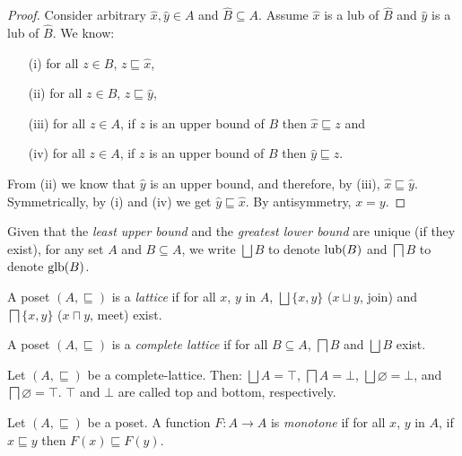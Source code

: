 \begin{proof}
    Consider arbitrary $\hat{x}, \hat{y} \in A$ and $\hat B \subseteq A$. Assume $\hat x$ is a lub of $\hat B$
    and $\hat y$ is a lub of $\hat B$. We know:
    \begin{enumerate}
        \item[(i)] for all $z \in B$, $z \sqsubseteq \hat{x}$,
        \item[(ii)] for all $z \in B$, $z \sqsubseteq \hat{y}$,
        \item[(iii)] for all $z \in A$, if $z$ is an upper bound of $B$ then
        $\hat x \sqsubseteq z$ and
        \item[(iv)]for all $z \in A$, if $z$ is an upper bound of $B$ then $\hat
        y \sqsubseteq z$.
    \end{enumerate}
    From (ii) we know that $\hat{y}$ is an upper bound, and therefore, by (iii), $\hat{x} \sqsubseteq \hat{y}$. Symmetrically, by (i) and (iv) we get $\hat{y} \sqsubseteq \hat{x}$. By antisymmetry, $x = y$.
\end{proof}

Given that the \emph{least upper bound} and the \emph{greatest lower bound} are unique (if they exist), for any set $A$ and $B \subseteq A$, we write $\bigsqcup B$ to denote $\operatorname{lub}(B)$ and $\bigsqcap B$ to denote $\operatorname{glb}(B)$.

\begin{definition}[Lattice]
    A poset $(A,\sqsubseteq)$ is a \emph{lattice} if for all $x$, $y$ in $A$, $\bigsqcup \{x,y\}$ ($x \sqcup y$, join) and $\bigsqcap \{x,y\}$ ($x \sqcap y$, meet) exist.
\end{definition}

\begin{definition}
    A poset $(A,\sqsubseteq)$ is a \emph{complete lattice} if for all $B \subseteq A$, $\bigsqcap B$ and $\bigsqcup B$ exist.
\end{definition}

\begin{example}
    Let $(A,\sqsubseteq)$ be a complete-lattice. Then: $\bigsqcup A = \top$, $\bigsqcap A = \bot$, $\bigsqcup \varnothing = \bot$, and $\bigsqcap \varnothing = \top$. $\top$ and $\bot$ are called top and bottom, respectively.
\end{example}

\begin{definition}
Let $(A, \sqsubseteq)$ be a poset. A function $F: A \to A$ is \emph{monotone} if for all $x$, $y$ in $A$, if $x \sqsubseteq y$ then $F(x) \sqsubseteq F(y)$.
\end{definition}


